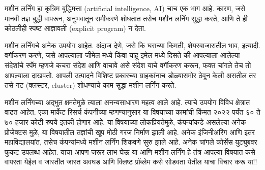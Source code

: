 मशीन लर्निंग हा कृत्रिम बुद्धिमत्ता (artificial intelligence, AI) चाच एक भाग आहे. कारण, जसे मानवी तज्ञ बुद्धी वापरून, अनुभवातून समीकरणे शोधतात तसेच मशीन लर्निंग सुद्धा करते, आणि ते ही कोठलीही स्पष्ट आज्ञावली (explicit program) न देता.

मशीन लर्निंगचे अनेक उपयोग आहेत. अंदाज देणे, जसे कि घराच्या किमती, शेयरबाजारातील भाव, इत्यादी. वर्गीकरण करणे, जसे आपल्याला जीमेल मध्ये किंवा याहू इमेल मध्ये दिसते की आपल्याला आलेल्या संदेशांचे स्पॅम म्हणजे कचरा संदेश आणि वाचावे असे संदेश याचे वर्गीकरण करून, फक्त चांगले तेच तो आपल्याला दाखवतो. आपली उत्पादने विशिष्ट प्रकारच्या ग्राहकांनाच डोळ्यासमोर ठेवून केली असतील तर तसे गट (क्लस्टर, cluster) शोधण्याचे काम सुद्धा मशीन लर्निंग करते.

मशीन लर्निंगच्या अद्भुत क्षमतेमुळे त्याला अनन्यसाधारण महत्व आले आहे. त्याचे उपयोग विविध क्षेत्रात वाढत आहेत. एका मार्केट रिसर्च कंपनीच्या म्हणण्यानुसार या विषयाच्या कामांची किंमत २०२२ पर्यंत ६० ते ७० हजार कोटी रुपये इतकी होणार आहे. या विषयाच्या लोकप्रियतेमुळे, कंपन्यांकडे असलेल्या अनेक प्रोजेक्टस मुळे, या विषयातील तज्ञांची खूप मोठी गरज निर्माण झाली आहे. अनेक इंजिनीअरिंग आणि इतर महाविद्यालयांत, तसेच कंपन्यांमध्ये मशीन लर्निंग शिकवणे सुरु झाले आहे. अनेक चांगले कोर्सेस युट्युबवर फुकट उपलब्ध आहेत. याचा आपण जरूर लाभ घेऊ या आणि मशीन लर्निंग हे तंत्र आपल्या विषयात कसे वापरता येईल व जास्तीत जास्त अवघड आणि क्लिष्ट प्रॉब्लेम कसे सोडवता येतील याचा विचार करू या!!